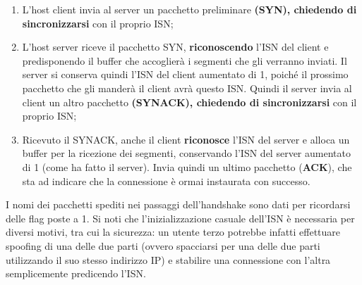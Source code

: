         \begin{enumerate}
            \item L’host client invia al server un pacchetto preliminare \textbf{(SYN), chiedendo di
            sincronizzarsi} con il proprio ISN;
            \item  L’host server riceve il pacchetto SYN, \textbf{riconoscendo} l’ISN del client e predisponendo il
            buffer che accoglierà i segmenti che gli verranno inviati. Il server si conserva quindi l’ISN
            del client aumentato di 1, poiché il prossimo pacchetto che gli manderà il client avrà
            questo ISN. Quindi il server invia al client un altro pacchetto \textbf{(SYNACK), chiedendo di
            sincronizzarsi} con il proprio ISN;
            \item Ricevuto il SYNACK, anche il client \textbf{riconosce} l’ISN del server e alloca un buffer per la
            ricezione dei segmenti, conservando l’ISN del server aumentato di 1 (come ha fatto il
            server). Invia quindi un ultimo pacchetto (\textbf{ACK}), che sta ad indicare che la connessione
            è ormai instaurata con successo. 
                        
        \end{enumerate}

        I nomi dei pacchetti spediti nei passaggi dell’handshake sono dati per ricordarsi delle flag poste
        a 1. Si noti che l’inizializzazione casuale dell’ISN è necessaria per diversi motivi, tra cui la
        sicurezza: un utente terzo potrebbe infatti effettuare spoofing di una delle due parti (ovvero
        spacciarsi per una delle due parti utilizzando il suo stesso indirizzo IP) e stabilire una
        connessione con l’altra semplicemente predicendo l’ISN.\\
        
